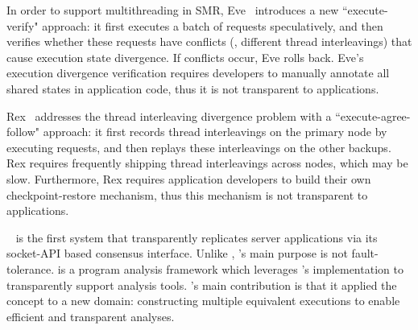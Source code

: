 In order to support multithreading in SMR, Eve~\cite{eve:osdi12} introduces a 
new ``execute-verify" approach: it first executes a batch of requests 
speculatively, and then verifies whether these requests have conflicts (\eg, 
different thread interleavings) that cause execution state divergence. If 
conflicts occur, Eve rolls back. Eve's execution divergence verification 
requires developers to manually annotate all shared states in application code, 
thus it is not transparent to applications.

Rex~\cite{rex:eurosys14} addresses the thread interleaving divergence problem 
with a ``execute-agree-follow" approach: it first records thread interleavings 
on the primary node by executing requests, and then replays these interleavings 
on the other backups. Rex requires frequently shipping thread interleavings 
across nodes, which may be slow. Furthermore, Rex requires application 
developers to build their own checkpoint-restore mechanism, thus this mechanism 
is not transparent to applications.

\repbox~\cite{repbox:sosp15} is the first \smr system that transparently 
replicates server applications via its socket-API based \paxos consensus 
interface. Unlike \repbox, \xxx's main purpose is not fault-tolerance. \xxx is 
a program analysis framework which leverages \repbox's \paxos implementation to 
transparently support analysis tools. \xxx's main contribution is that it 
applied the \smr concept to a new domain: constructing multiple equivalent 
executions to enable efficient and transparent analyses.

